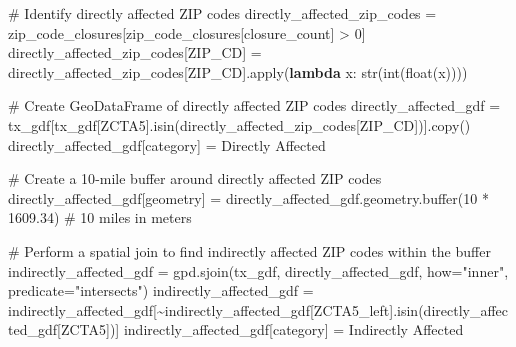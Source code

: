 \documentclass[
  letterpaper,
  DIV=11,
  numbers=noendperiod]{scrartcl}
\newenvironment{Shaded}{\begin{snugshade}}{\end{snugshade}}
\newcommand{\BuiltInTok}[1]{\textcolor[rgb]{0.00,0.23,0.31}{#1}}
\newcommand{\CommentTok}[1]{\textcolor[rgb]{0.37,0.37,0.37}{#1}}
\newcommand{\DecValTok}[1]{\textcolor[rgb]{0.68,0.00,0.00}{#1}}
\newcommand{\FloatTok}[1]{\textcolor[rgb]{0.68,0.00,0.00}{#1}}
\newcommand{\KeywordTok}[1]{\textcolor[rgb]{0.00,0.23,0.31}{\textbf{#1}}}
\newcommand{\NormalTok}[1]{\textcolor[rgb]{0.00,0.23,0.31}{#1}}
\newcommand{\OperatorTok}[1]{\textcolor[rgb]{0.37,0.37,0.37}{#1}}
\newcommand{\StringTok}[1]{\textcolor[rgb]{0.13,0.47,0.30}{#1}}
\begin{document}
\begin{Shaded}
\begin{Highlighting}[]
\CommentTok{\# Identify directly affected ZIP codes}
\NormalTok{directly\_affected\_zip\_codes }\OperatorTok{=}\NormalTok{ zip\_code\_closures[zip\_code\_closures[}\StringTok{\textquotesingle{}closure\_count\textquotesingle{}}\NormalTok{] }\OperatorTok{\textgreater{}} \DecValTok{0}\NormalTok{]}
\NormalTok{directly\_affected\_zip\_codes[}\StringTok{\textquotesingle{}ZIP\_CD\textquotesingle{}}\NormalTok{] }\OperatorTok{=}\NormalTok{ directly\_affected\_zip\_codes[}\StringTok{\textquotesingle{}ZIP\_CD\textquotesingle{}}\NormalTok{].}\BuiltInTok{apply}\NormalTok{(}\KeywordTok{lambda}\NormalTok{ x: }\BuiltInTok{str}\NormalTok{(}\BuiltInTok{int}\NormalTok{(}\BuiltInTok{float}\NormalTok{(x))))}

\CommentTok{\# Create GeoDataFrame of directly affected ZIP codes}
\NormalTok{directly\_affected\_gdf }\OperatorTok{=}\NormalTok{ tx\_gdf[tx\_gdf[}\StringTok{\textquotesingle{}ZCTA5\textquotesingle{}}\NormalTok{].isin(directly\_affected\_zip\_codes[}\StringTok{\textquotesingle{}ZIP\_CD\textquotesingle{}}\NormalTok{])].copy()}
\NormalTok{directly\_affected\_gdf[}\StringTok{\textquotesingle{}category\textquotesingle{}}\NormalTok{] }\OperatorTok{=} \StringTok{\textquotesingle{}Directly Affected\textquotesingle{}}

\CommentTok{\# Create a 10{-}mile buffer around directly affected ZIP codes}
\NormalTok{directly\_affected\_gdf[}\StringTok{\textquotesingle{}geometry\textquotesingle{}}\NormalTok{] }\OperatorTok{=}\NormalTok{ directly\_affected\_gdf.geometry.}\BuiltInTok{buffer}\NormalTok{(}\DecValTok{10} \OperatorTok{*} \FloatTok{1609.34}\NormalTok{)  }\CommentTok{\# 10 miles in meters}

\CommentTok{\# Perform a spatial join to find indirectly affected ZIP codes within the buffer}
\NormalTok{indirectly\_affected\_gdf }\OperatorTok{=}\NormalTok{ gpd.sjoin(tx\_gdf, directly\_affected\_gdf, how}\OperatorTok{=}\StringTok{"inner"}\NormalTok{, predicate}\OperatorTok{=}\StringTok{"intersects"}\NormalTok{)}
\NormalTok{indirectly\_affected\_gdf }\OperatorTok{=}\NormalTok{ indirectly\_affected\_gdf[}\OperatorTok{\textasciitilde{}}\NormalTok{indirectly\_affected\_gdf[}\StringTok{\textquotesingle{}ZCTA5\_left\textquotesingle{}}\NormalTok{].isin(directly\_affected\_gdf[}\StringTok{\textquotesingle{}ZCTA5\textquotesingle{}}\NormalTok{])]}
\NormalTok{indirectly\_affected\_gdf[}\StringTok{\textquotesingle{}category\textquotesingle{}}\NormalTok{] }\OperatorTok{=} \StringTok{\textquotesingle{}Indirectly Affected\textquotesingle{}}


\end{Highlighting}
\end{Shaded}
\end{document}
